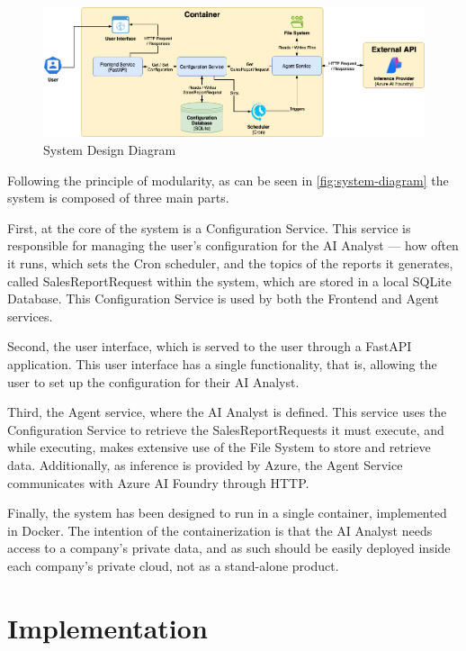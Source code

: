 \documentclass[a4paper]{report}
\begin{document}
\begin{figure}[h]
\centering
\includegraphics[width=1\textwidth]{images/system-diagram.png}
\caption{System Design Diagram}
\label{fig:system-diagram}
\end{figure}

Following the principle of modularity, as can be seen in \autoref{fig:system-diagram} the system is composed of three main parts.

First, at the core of the system is a Configuration Service. This service is responsible for managing the user's configuration for the AI Analyst --- how often it runs, which sets the Cron scheduler, and the topics of the reports it generates, called SalesReportRequest within the system, which are stored in a local SQLite Database. This Configuration Service is used by both the Frontend and Agent services.

Second, the user interface, which is served to the user through a FastAPI application. This user interface has a single functionality, that is, allowing the user to set up the configuration for their AI Analyst. 

Third, the Agent service, where the AI Analyst is defined. This service uses the Configuration Service to retrieve the SalesReportRequests it must execute, and while executing, makes extensive use of the File System to store and retrieve data. Additionally, as inference is provided by Azure, the Agent Service communicates with Azure AI Foundry through HTTP.

Finally, the system has been designed to run in a single container, implemented in Docker. The intention of the containerization is that the AI Analyst needs access to a company's private data, and as such should be easily deployed inside each company's private cloud, not as a stand-alone product.

\section{Implementation}
\label{sec:implementation}
\end{document}
